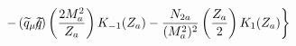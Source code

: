 \begin{equation}
-\left(\widetilde{q}_{\mu}\widetilde{q}\hspace{-0.20cm}/\right)
\left(\frac{2M_{a}^{2}}{Z_{a}}\right)K_{-1}(Z_{a})
-\frac{N_{2a}}{(M^{2}_{a})^{2}}
\left(\frac{Z_{a}}{2}\right)K_{1}(Z_{a})\biggr\}
\end{equation}\
